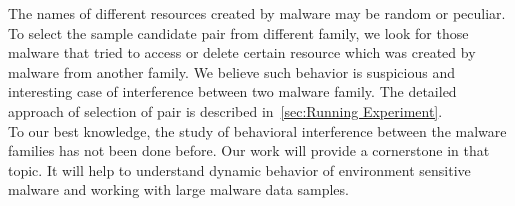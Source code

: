 The names of different resources created by malware may  be random or peculiar.
To select the sample candidate pair from different family, we look for those malware that tried to access or delete certain resource which was created by malware from another family.
We believe such behavior is suspicious and interesting case of interference between two malware family.
The detailed approach of selection of pair is described in~\autoref{sec:Running Experiment}.\\
To our best knowledge, the study of behavioral interference between the malware families has not been done before.
Our work will provide a cornerstone in that topic.
It will help to understand dynamic behavior of environment sensitive malware and working with large malware data samples.
